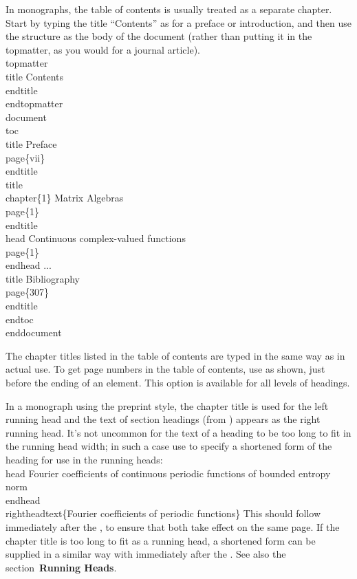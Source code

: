 In monographs, the table of contents is usually treated as a separate
chapter.  Start by typing the title ``Contents'' as for a preface or
introduction, and then use the  structure as the
body of the document (rather than putting it in the topmatter, as you
would for a journal article).
\beginexample{}
\\topmatter
\\title Contents\\endtitle
\\endtopmatter
\bigskip
\\document
\\toc
\\title Preface\\page\{vii\}\\endtitle
\\title\\chapter\{1\} Matrix Algebras\\page\{1\}\\endtitle
\\head Continuous complex-valued functions\\page\{1\}\\endhead
...
\\title Bibliography\\page\{307\}\\endtitle
\\endtoc
\\enddocument
\endexample

The chapter titles listed in the table of contents are typed in the same
way as in actual use.  To get page numbers in the table of contents, use
 as shown, just before the ending of an element.  This option
is available for all levels of headings.

In a monograph using the preprint style, the chapter title is used for
the left running head and the text of section headings
(from ) appears as the right running head.  
It's not uncommon for the text of a heading to be too long to fit
in the running head width; in such a case use  to
specify a shortened form of the heading for use in the running heads:
\beginexample{}
\\head Fourier coefficients of continuous periodic functions
of bounded entropy norm\\endhead
\\rightheadtext\{Fourier coefficients of periodic functions\}
\endexample
\noindent This should follow immediately after the , to ensure
that both take effect on the same page.  If the chapter title is too long
to fit as a running head, a shortened form can be supplied in a similar
way with  immediately after the .
See also the section~{\bf Running Heads}.

